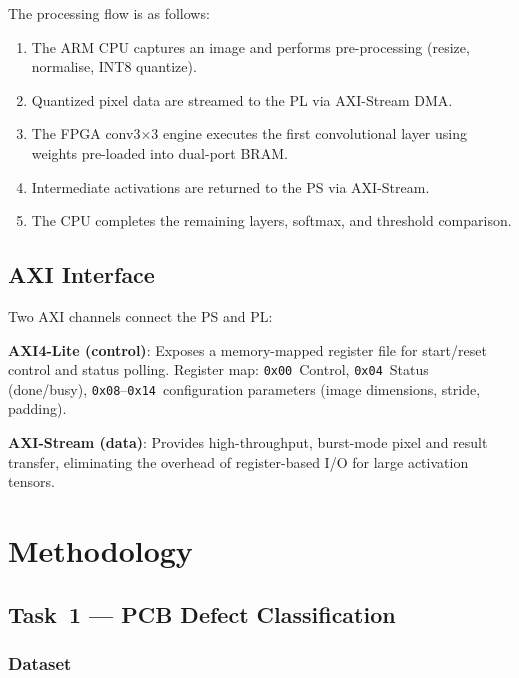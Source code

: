 \documentclass[conference]{IEEEtran}
\begin{document}
The processing flow is as follows:
\begin{enumerate}
    \item The ARM CPU captures an image and performs pre-processing (resize, normalise, INT8 quantize).
    \item Quantized pixel data are streamed to the PL via AXI-Stream DMA.
    \item The FPGA conv3$\times$3 engine executes the first convolutional layer using weights pre-loaded into dual-port BRAM.
    \item Intermediate activations are returned to the PS via AXI-Stream.
    \item The CPU completes the remaining layers, softmax, and threshold comparison.
\end{enumerate}

\subsection{AXI Interface}

Two AXI channels connect the PS and PL:

\textbf{AXI4-Lite (control)}: Exposes a memory-mapped register file for start/reset control and status polling. Register map: \texttt{0x00}~Control, \texttt{0x04}~Status (done/busy), \texttt{0x08}--\texttt{0x14}~configuration parameters (image dimensions, stride, padding).

\textbf{AXI-Stream (data)}: Provides high-throughput, burst-mode pixel and result transfer, eliminating the overhead of register-based I/O for large activation tensors.

\section{Methodology}
\label{sec:methodology}

\subsection{Task~1 --- PCB Defect Classification}

\subsubsection{Dataset}
\end{document}
